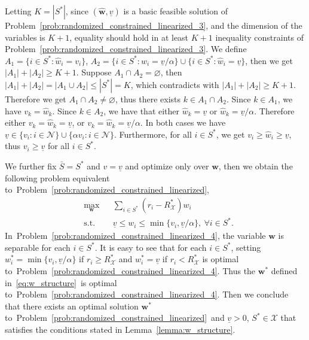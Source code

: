 \documentclass[mnsc,non-blindrev]{informs3}
\theoremstyle{definition}
\begin{document}
\begin{appendices}{\Large{}}
Letting $K=|S^*|$, since $(\hat{\bm{w}},\underline{v})$ is a basic feasible solution of Problem~\eqref{prob:randomized_constrained_linearized_3}, and the dimension of the variables is $K+1$, equality should hold in at least $K+1$ inequality constraints of Problem~\eqref{prob:randomized_constrained_linearized_3}. We define \mbox{$A_1=\{i\in S^*:\hat{w}_i=v_i\}$,} \mbox{$A_2=\{i\in S^*:\hat{w}_i=\underline{v}/\alpha\}\cup\{i\in S^*:\hat{w}_i=\underline{v}\}$,} then we get \mbox{$|A_1|+|A_2|\geq K+1$.} Suppose $A_1\cap A_2=\varnothing$, then $|A_1|+|A_2|=|A_1\cup A_2|\leq |S^*|=K$, which contradicts with $|A_1|+|A_2|\geq K+1$. Therefore we get $A_1\cap A_2\neq\varnothing$, thus there exists $k\in A_1\cap A_2$. Since $k\in A_1$, we have $v_k=\hat{w}_k$. Since $k\in A_2$, we have that either $\hat{w}_k=\underline{v}$ or $\hat{w}_k=\underline{v}/\alpha$. Therefore either $v_k=\hat{w}_k=\underline{v}$, or $v_k=\hat{w}_k=\underline{v}/\alpha$. In both cases we have $\underline{v}\in\{v_i:i\in\mathcal{N}\}\cup\{\alpha v_i:i\in\mathcal{N}\}$. Furthermore, for all $i\in S^*$, we get $v_i\geq \hat{w}_i\geq \underline{v}$, thus $v_i\geq \underline{v}$ for all $i\in S^*$.

We further fix $\bar{S}=S^*$ and $v=\underline{v}$ and optimize only over $\bm{w}$, then we obtain the following problem equivalent to~Problem~\eqref{prob:randomized_constrained_linearized},
\begin{equation}\label{prob:randomized_constrained_linearized_4}
\begin{aligned}
&\max_{\bm{w}}&&\sum_{i\in S^*}(r_i-R_{\mathcal{X}}^*)w_i\\
&\text{s.t.}&&\underline{v}\leq w_i\leq \min\{v_i,\underline{v}/\alpha\},\ \forall i\in S^*.
\end{aligned}
\end{equation}
In~Problem~\eqref{prob:randomized_constrained_linearized_4}, the variable $\bm{w}$ is separable for each $i\in S^*$. It is easy to see that for each $i\in S^*$, setting $w_i^*=\min\{v_i,\underline{v}/\alpha\}$ if $r_i\geq R^*_{\mathcal{X}}$ and $w_i^*=\underline{v}$ if $r_i<R^*_{\mathcal{X}}$ is optimal to~Problem~\eqref{prob:randomized_constrained_linearized_4}. Thus the $\bm{w}^*$ defined in~\eqref{eq:w_structure}~is optimal to~Problem~\eqref{prob:randomized_constrained_linearized_4}. Then we conclude that there exists an optimal solution $\bm{w}^*$ to~Problem~\eqref{prob:randomized_constrained_linearized}~and $\underline{v}>0$, $S^*\in\mathcal{X}$ that satisfies the conditions stated in Lemma~\ref{lemma:w_structure}.


\end{appendices}
\end{document}
